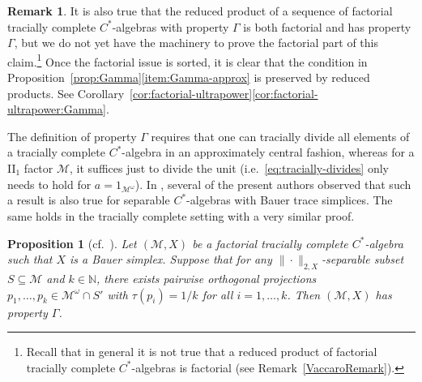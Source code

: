 \documentclass[a4paper,11pt]{amsart}
\newtheorem{proposition}[theorem]{Proposition}
\theoremstyle{definition}
\newtheorem{remark}[theorem]{Remark}
\numberwithin{equation}{section}
\numberwithin{theorem}{section}
\newcommand{\N}{\mathbb N}
\newcommand{\M}{\mathcal{M}}
\begin{document}
\begin{remark}\label{rem:GammaUltrapower}
It is also true that the reduced product of a sequence of factorial tracially complete $C^*$-algebras with property $\Gamma$ is both factorial and has property $\Gamma$, but we do not yet have the machinery to prove the factorial part of this claim.\footnote{Recall that in general it is not true that a reduced product of factorial tracially complete $C^*$-algebras is factorial (see Remark~\ref{VaccaroRemark}).} Once the factorial issue is sorted, it is clear that the condition in Proposition~\ref{prop:Gamma}\ref{item:Gamma-approx} is preserved by reduced products.  See Corollary~\ref{cor:factorial-ultrapower}\ref{cor:factorial-ultrapower:Gamma}.
\end{remark}

The definition of property $\Gamma$ requires that one can tracially divide all elements of a tracially complete $C^*$-algebra in an approximately central fashion, whereas for a II$_1$ factor $\M$, it suffices just to divide the unit (i.e.\ \eqref{eq:tracially-divides} only needs to hold for $a=1_{\M^\omega}$).  In \cite[Proposition 3.2]{CETW}, several of the present authors observed that such a result is also true for separable $C^*$-algebras with Bauer trace simplices.  The same holds in the tracially complete setting with a very similar proof.

\begin{proposition}[{cf.\ \cite[Corollary 3.2]{CETW}}] \label{prop:BauerDivideUnit}
Let $(\M,X)$ be a factorial tracially complete $C^*$-algebra such that $X$ is a Bauer simplex.  Suppose that for any $\|\cdot\|_{2, X}$-separable subset $S\subseteq \M$ and $k\in \N$, there exists pairwise orthogonal projections $p_1,\dots,p_k\in\M^\omega\cap S'$ with $\tau(p_i)=1/k$ for all $i=1,\dots,k$. Then $(\M,X)$ has property $\Gamma$.
\end{proposition}
\end{document}
